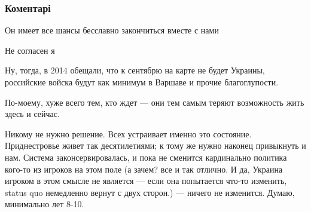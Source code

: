  
 
 
 
 
\subsubsection{Коментарі}
\label{sec:05_08_2021.fb.zharkih_denis.1.pismo_2014.cmt}

\begin{itemize}
 
Он имеет все шансы бесславно закончиться вместе с нами

 
Не согласен я

 

Ну, тогда, в 2014 обещали, что к сентябрю на карте не будет Украины, российские
войска будут как минимум в Варшаве \Smiley[1.0][yellow] и прочие благоглупости.

По-моему, хуже всего тем, кто ждет — они тем самым теряют возможность жить
здесь и сейчас.

Никому не нужно решение. Всех устраивает именно это состояние. Приднестровье
живет так десятилетиями; к тому же нужно наконец привыкнуть и нам. Система
законсервировалась, и пока не сменится кардинально политика кого-то из игроков
на этом поле (а зачем? все и так отлично. И да, Украина игроком в этом смысле
не является — если она попытается что-то изменить, status quo немедленно вернут
с двух сторон.) — ничего не изменится. Думаю, минимально лет 8-10.


\end{itemize}
